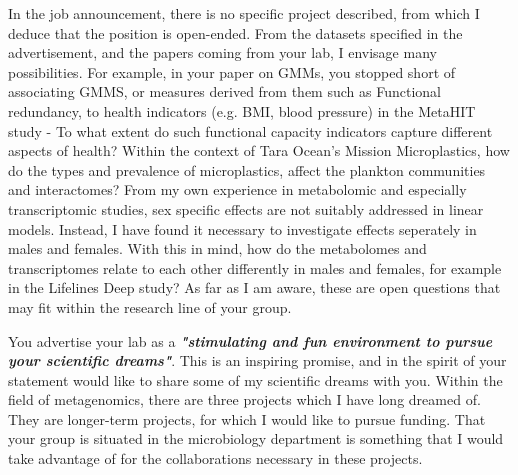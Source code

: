\documentclass[letterpaper, 10pt]{article} %
\begin{document}
\begin{tcolorbox}[
	blanker,
	width=0.95\textwidth,
	enlarge left by=0.025\textwidth,
	enlarge right by=0.025\textwidth,
	before skip=6pt,
	breakable]
In the job announcement, there is no specific project described, from which I deduce that the position is open-ended. From the datasets specified in the advertisement, and the papers coming from your lab, I envisage many possibilities. For example, in your paper on GMMs, you stopped short of associating GMMS, or measures derived from them such as Functional redundancy, to health indicators (e.g. BMI, blood pressure) in the MetaHIT study - To what extent do such functional capacity indicators capture different aspects of health? Within the context of Tara Ocean's Mission Microplastics, how do the types and prevalence of microplastics, affect the plankton communities and interactomes? From my own experience in metabolomic and especially transcriptomic studies, sex specific effects are not suitably addressed in linear models. Instead, I have found it necessary to investigate effects seperately in males and females. With this in mind, how do the metabolomes and transcriptomes relate to each other differently in males and females, for example in the Lifelines Deep study? As far as I am aware, these are open questions that may fit within the research line of your group.

You advertise your lab as a \textbf{\textit{"stimulating and fun environment to pursue your scientific dreams"}}. This is an inspiring promise, and in the spirit of your statement would like to share some of my scientific dreams with you. Within the field of metagenomics, there are three projects which I have long dreamed of. They are longer-term projects, for which I would like to pursue funding. That your group is situated in the microbiology department is something that I would take advantage of for the collaborations necessary in these projects.


\end{tcolorbox}
\end{document}
